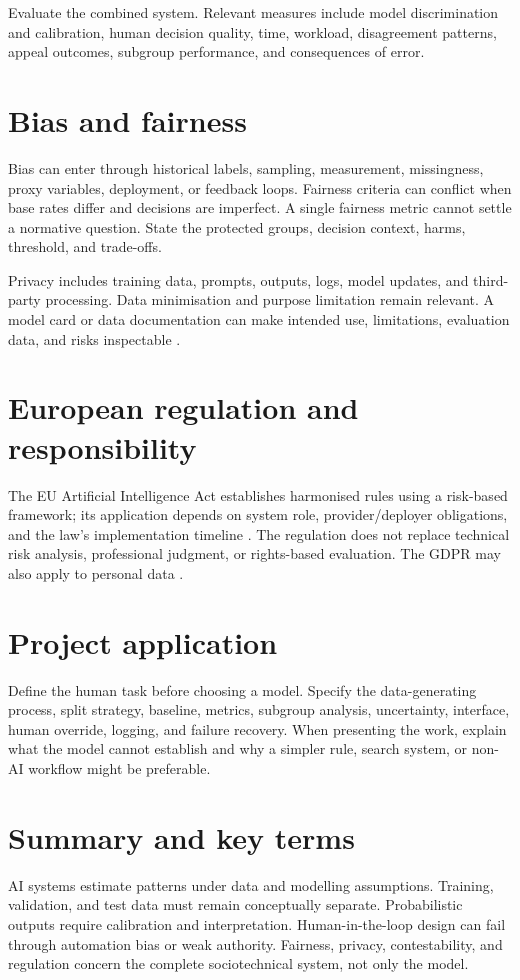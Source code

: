 Evaluate the combined system. Relevant measures include model discrimination and calibration, human decision quality, time, workload, disagreement patterns, appeal outcomes, subgroup performance, and consequences of error.

\section{Bias and fairness}
Bias can enter through historical labels, sampling, measurement, missingness, proxy variables, deployment, or feedback loops. Fairness criteria can conflict when base rates differ and decisions are imperfect. A single fairness metric cannot settle a normative question. State the protected groups, decision context, harms, threshold, and trade-offs.

Privacy includes training data, prompts, outputs, logs, model updates, and third-party processing. Data minimisation and purpose limitation remain relevant. A model card or data documentation can make intended use, limitations, evaluation data, and risks inspectable \citep{bender2021stochastic,mitchell2019model}.

\section{European regulation and responsibility}
The EU Artificial Intelligence Act establishes harmonised rules using a risk-based framework; its application depends on system role, provider/deployer obligations, and the law's implementation timeline \citep{euaiact2024}. The regulation does not replace technical risk analysis, professional judgment, or rights-based evaluation. The GDPR may also apply to personal data \citep{gdpr2016}.

\section{Project application}
Define the human task before choosing a model. Specify the data-generating process, split strategy, baseline, metrics, subgroup analysis, uncertainty, interface, human override, logging, and failure recovery. When presenting the work, explain what the model cannot establish and why a simpler rule, search system, or non-AI workflow might be preferable.

\section{Summary and key terms}
AI systems estimate patterns under data and modelling assumptions. Training, validation, and test data must remain conceptually separate. Probabilistic outputs require calibration and interpretation. Human-in-the-loop design can fail through automation bias or weak authority. Fairness, privacy, contestability, and regulation concern the complete sociotechnical system, not only the model.

